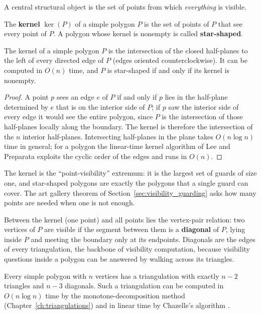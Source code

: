 A central structural object is the set of points from which \emph{everything}
is visible.

\begin{definition}[Kernel]\label{def:vis_kernel}
  The \textbf{kernel} $\operatorname{ker}(P)$ of a simple polygon $P$ is the
  set of points of $P$ that see every point of $P$. A polygon whose kernel is
  nonempty is called \textbf{star-shaped}.
\end{definition}

\begin{theorem}\label{thm:vis_kernel}
  The kernel of a simple polygon $P$ is the intersection of the closed
  half-planes to the left of every directed edge of $P$ (edges oriented
  counterclockwise). It can be computed in $O(n)$ time, and $P$ is
  star-shaped if and only if its kernel is nonempty.
\end{theorem}

\begin{proof}
  A point $p$ sees an edge $e$ of $P$ if and only if $p$ lies in the
  half-plane determined by $e$ that is on the interior side of $P$; if $p$
  saw the interior side of every edge it would see the entire polygon, since
  $P$ is the intersection of those half-planes locally along the boundary.
  The kernel is therefore the intersection of the $n$ interior half-planes.
  Intersecting half-planes in the plane takes $O(n \log n)$ time in general;
  for a polygon the linear-time kernel algorithm of Lee and Preparata
  \cite{lee1979} exploits the cyclic order of the edges and runs in $O(n)$.
\end{proof}

The kernel is the ``point-visibility'' extremum: it is the largest set of
guards of size one, and star-shaped polygons are exactly the polygons that a
single guard can cover. The art gallery theorem of
Section~\ref{sec:visibility_guarding} asks how many points are needed when
one is not enough.

Between the kernel (one point) and all points lies the vertex-pair relation:
two vertices of $P$ are visible if the segment between them is a
\textbf{diagonal} of $P$, lying inside $P$ and meeting the boundary only at
its endpoints. Diagonals are the edges of every triangulation, the backbone
of visibility computation, because visibility questions inside a polygon
can be answered by walking across its triangles.

\begin{theorem}[Triangulation]\label{thm:vis_triangulation}
  Every simple polygon with $n$ vertices has a triangulation with exactly
  $n-2$ triangles and $n-3$ diagonals. Such a triangulation can be computed
  in $O(n \log n)$ time by the monotone-decomposition method
  (Chapter~\ref{ch:triangulations}) and in linear time by Chazelle's
  algorithm \cite{chazelle1991}.
\end{theorem}

